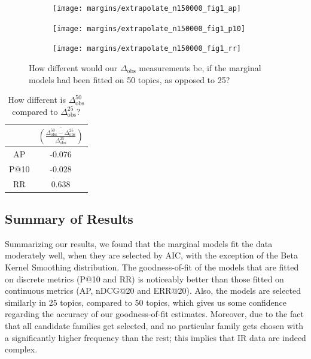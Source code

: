 \begin{figure}[!t]
	\centering	
	\begin{subfigure}[t]{.33\textwidth}
		\centering
		\texttt{[image: margins/extrapolate\_n150000\_fig1\_ap]}
	\end{subfigure}%
	\begin{subfigure}[t]{.33\textwidth}
		\centering
		\texttt{[image: margins/extrapolate\_n150000\_fig1\_p10]}
	\end{subfigure}
	\begin{subfigure}[t]{.33\textwidth}
		\centering
		\texttt{[image: margins/extrapolate\_n150000\_fig1\_rr]}
	\end{subfigure}
	\caption{How different would our $\Delta_\text{obs}$ measurements be, if the marginal models had been fitted on 50 topics, as opposed to 25?}
	\label{fig:margins-extrapolate-plot-1}
\end{figure}

\clearpage

\begin{table}[t]
	\centering
	\begin{tabular}{c c}
		\toprule
		& $\overline{\left(\frac{\Delta_\text{obs}^{50} - \Delta_\text{obs}^{25}}{\Delta_\text{obs}^{25}}\right)}$ \\ \midrule
		AP    & -0.076       \\
		P@10  & -0.028       \\
		RR    &  0.638       \\ \bottomrule
	\end{tabular}
	\caption{How different is $\Delta_\text{obs}^{50}$ compared to $\Delta_\text{obs}^{25}$?}
	\label{tab:margins-extrapolate-table-1}
\end{table}

\subsection{Summary of Results}

Summarizing our results, we found that the marginal models fit the data moderately well, when they are selected by AIC, with the exception of the Beta Kernel Smoothing distribution. The goodness-of-fit of the models that are fitted on discrete metrics (P@10 and RR) is noticeably better than those fitted on continuous metrics (AP, nDCG@20 and ERR@20). Also, the models are selected similarly in 25 topics, compared to 50 topics, which gives us some confidence regarding the accuracy of our goodness-of-fit estimates. Moreover, due to the fact that all candidate families get selected, and no particular family gets chosen with a significantly higher frequency than the rest; this implies that IR data are indeed complex.

